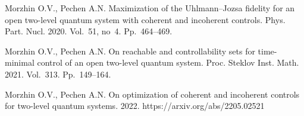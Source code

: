\documentclass[12pt]{llncs}
\begin{document}
\begin{thebibliography}{99}
Morzhin O.V., Pechen A.N. Maximization of the Uhlmann--Jozsa 
fidelity for an open two-level quantum system with coherent and 
incoherent controls. Phys. Part. Nucl. 2020. Vol.~51, no~4. Pp.~464--469.

Morzhin O.V., Pechen A.N. On reachable and controllability sets for
time-minimal control of an open two-level quantum system. Proc. Steklov Inst. Math. 2021. Vol.~313. Pp.~149--164. 

Morzhin O.V., Pechen A.N. On optimization of coherent and incoherent controls for two-level quantum systems.  2022. https://arxiv.org/abs/2205.02521 

\end{thebibliography}
\end{document}
